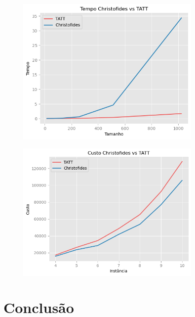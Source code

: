 \documentclass{article}
\begin{document}
\begin{figure} [H]
	\includegraphics[width=9cm]{tempo_vs}
	\centering
\end{figure}

\begin{figure} [H]
	\includegraphics[width=9cm]{custo_vs}
	\centering
\end{figure}

\section{Conclusão}

\end{document}
